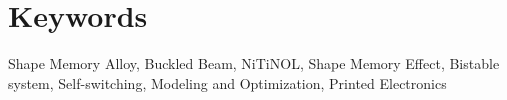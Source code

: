\section{Keywords}\label{sec:keywords}
Shape Memory Alloy, Buckled Beam, NiTiNOL, Shape Memory Effect, Bistable system, Self-switching, Modeling and Optimization, Printed Electronics
